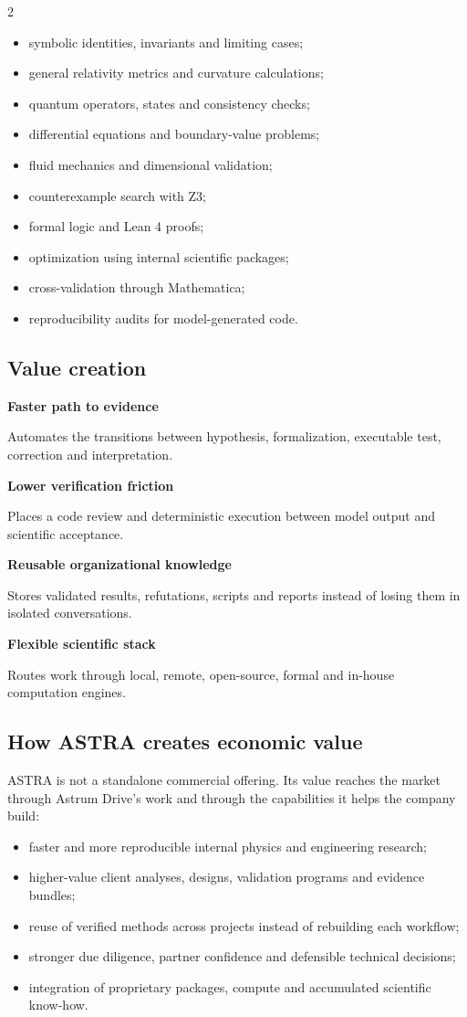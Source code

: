 \documentclass[10pt,a4paper]{article}
\newcommand{\stage}[2]{%
  \begin{minipage}[t]{0.47\linewidth}
  {\bfseries\color{navy}#1}\par
  {\small #2}
  \end{minipage}
}
\begin{document}
\begin{multicols}{2}
\begin{itemize}
  \item symbolic identities, invariants and limiting cases;
  \item general relativity metrics and curvature calculations;
  \item quantum operators, states and consistency checks;
  \item differential equations and boundary-value problems;
  \item fluid mechanics and dimensional validation;
  \item counterexample search with Z3;
  \item formal logic and Lean 4 proofs;
  \item optimization using internal scientific packages;
  \item cross-validation through Mathematica;
  \item reproducibility audits for model-generated code.
\end{itemize}
\end{multicols}

\subsection*{Value creation}

\stage{Faster path to evidence}{Automates the transitions between hypothesis, formalization, executable test, correction and interpretation.}
\hfill
\stage{Lower verification friction}{Places a code review and deterministic execution between model output and scientific acceptance.}

\vspace{4mm}
\stage{Reusable organizational knowledge}{Stores validated results, refutations, scripts and reports instead of losing them in isolated conversations.}
\hfill
\stage{Flexible scientific stack}{Routes work through local, remote, open-source, formal and in-house computation engines.}

\subsection*{How ASTRA creates economic value}

ASTRA is not a standalone commercial offering. Its value reaches the market through
Astrum Drive's work and through the capabilities it helps the company build:

\begin{itemize}[itemsep=1pt,topsep=1pt]
  \item faster and more reproducible internal physics and engineering research;
  \item higher-value client analyses, designs, validation programs and evidence bundles;
  \item reuse of verified methods across projects instead of rebuilding each workflow;
  \item stronger due diligence, partner confidence and defensible technical decisions;
  \item integration of proprietary packages, compute and accumulated scientific know-how.
\end{itemize}
\end{document}
